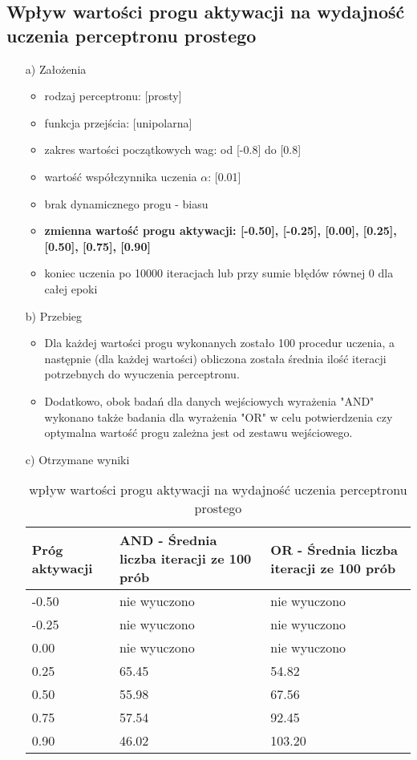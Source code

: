 \documentclass[17pt]{article}
\begin{document}
\subsection{Wpływ wartości progu aktywacji na wydajność uczenia perceptronu prostego}
\vspace{4mm}
\begin{enumerate}

\item[a)] Założenia

\begin{itemize}
\item rodzaj perceptronu: [prosty]
\item funkcja przejścia: [unipolarna]
\item zakres wartości początkowych wag: od [-0.8] do [0.8]
\item wartość współczynnika uczenia $\alpha$: [0.01]
\item brak dynamicznego progu - biasu
\item \textbf{zmienna wartość progu aktywacji: [-0.50], [-0.25], [0.00], [0.25], [0.50], [0.75], [0.90]}
\item koniec uczenia po 10000 iteracjach lub przy sumie błędów równej 0 dla całej epoki
\end{itemize}

\item[b)] Przebieg

\begin{itemize}
\item Dla każdej wartości progu wykonanych zostało 100 procedur uczenia, a następnie (dla każdej wartości) obliczona została średnia ilość iteracji potrzebnych do wyuczenia perceptronu.
\item Dodatkowo, obok badań dla danych wejściowych wyrażenia "AND" wykonano także badania dla wyrażenia "OR" w celu potwierdzenia czy optymalna wartość progu zależna jest od zestawu wejściowego.
\end{itemize}
\item[c)] Otrzymane wyniki

\begin{table}[ht]
\centering
\begin{tabular}{|p{4cm}|p{4cm}|p{4cm}|}
 \hline
 Próg aktywacji & AND - Średnia liczba iteracji ze 100 prób & OR - Średnia liczba iteracji ze 100 prób\\ \hline
 -0.50 & nie wyuczono & nie wyuczono\\ 
 -0.25 & nie wyuczono & nie wyuczono\\ 
 0.00 & nie wyuczono & nie wyuczono\\ 
 0.25 & 65.45 & 54.82\\ 
 0.50 & 55.98 & 67.56\\ 
 0.75 & 57.54 & 92.45\\ 
 0.90 & 46.02 & 103.20\\ 
 \hline
\end{tabular}
\caption{\label{tab:table1}wpływ wartości progu aktywacji na wydajność uczenia perceptronu prostego}
\end{table}


\end{enumerate}
\end{document}
